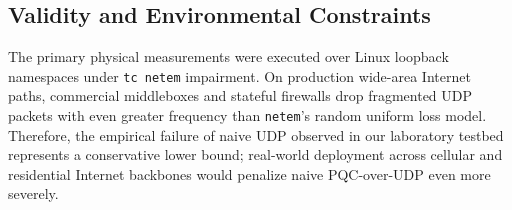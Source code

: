 \subsection{Validity and Environmental Constraints}
The primary physical measurements were executed over Linux loopback namespaces under \texttt{tc netem} impairment. On production wide-area Internet paths, commercial middleboxes and stateful firewalls drop fragmented UDP packets with even greater frequency than \texttt{netem}'s random uniform loss model. Therefore, the empirical failure of naive UDP observed in our laboratory testbed represents a conservative lower bound; real-world deployment across cellular and residential Internet backbones would penalize naive PQC-over-UDP even more severely.
